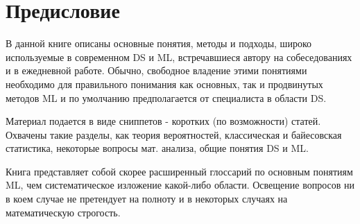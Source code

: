 \chapter*{Предисловие}

В данной книге описаны основные понятия, методы и подходы, широко используемые в современном DS и ML, встречавшиеся автору на собеседованиях и в ежедневной работе. Обычно, свободное владение этими понятиями необходимо для правильного понимания как основных, так и продвинутых методов ML и по умолчанию предполагается от специалиста в области DS.

Материал подается в виде сниппетов - коротких (по возможности) статей.
Охвачены такие разделы, как теория вероятностей, классическая и байесовская статистика, некоторые вопросы мат. анализа, общие понятия DS и ML.

Книга представляет собой скорее расширенный глоссарий по основным понятиям ML, чем систематическое изложение какой-либо области. Освещение вопросов ни в коем случае не претендует на полноту и в некоторых случаях на математическую строгость.

